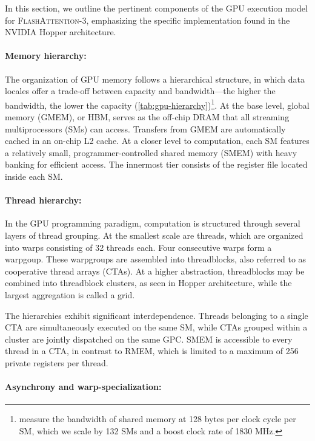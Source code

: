 In this section, we outline the pertinent components of the GPU execution model for \textsc{FlashAttention-3}, emphasizing the specific implementation found in the NVIDIA Hopper architecture.

\paragraph{Memory hierarchy:} The organization of GPU memory follows a hierarchical structure, in which data locales offer a trade-off between capacity and bandwidth—the higher the bandwidth, the lower the capacity (\cref{tab:gpu-hierarchy})\footnote{\citet{luo2024benchmarking} measure the bandwidth of shared memory at 128 bytes per clock cycle per SM, which we scale by 132 SMs and a boost clock rate of 1830 MHz.}. At the base level, global memory (GMEM), or HBM, serves as the off-chip DRAM that all streaming multiprocessors (SMs) can access. Transfers from GMEM are automatically cached in an on-chip L2 cache. At a closer level to computation, each SM features a relatively small, programmer-controlled shared memory (SMEM) with heavy banking for efficient access. The innermost tier consists of the register file located inside each SM.

\paragraph{Thread hierarchy:} In the GPU programming paradigm, computation is structured through several layers of thread grouping. At the smallest scale are threads, which are organized into warps consisting of 32 threads each. Four consecutive warps form a warpgoup. These warpgroups are assembled into threadblocks, also referred to as cooperative thread arrays (CTAs). At a higher abstraction, threadblocks may be combined into threadblock clusters, as seen in Hopper architecture, while the largest aggregation is called a grid.

The hierarchies exhibit significant interdependence. Threads belonging to a single CTA are simultaneously executed on the same SM, while CTAs grouped within a cluster are jointly dispatched on the same GPC. SMEM is accessible to every thread in a CTA, in contrast to RMEM, which is limited to a maximum of 256 private registers per thread.

\paragraph{Asynchrony and warp-specialization:}

